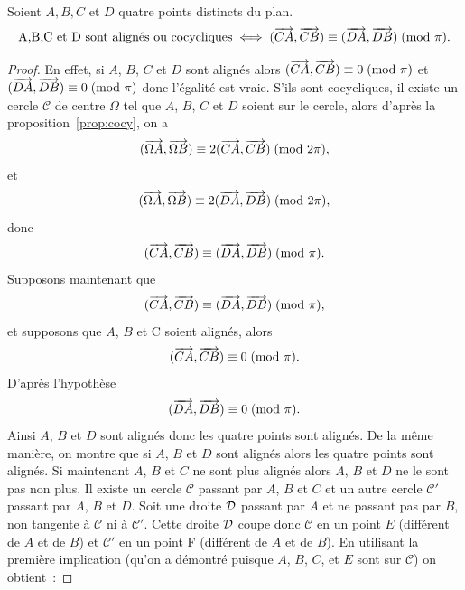 \begin{theo}
  Soient \(A,B,C\) et \(D\) quatre points distincts du plan.
  \begin{equation}
    \text{A,B,C et D sont alignés ou cocycliques} \iff (\overrightarrow{CA}, \overrightarrow{CB}) \equiv (\overrightarrow{DA}, \overrightarrow{DB})\!\pmod {\pi}.
  \end{equation}
\end{theo}
\begin{proof}
  En effet, si \(A\), \(B\), \(C\) et \(D\) sont alignés alors \((\overrightarrow{CA},\overrightarrow{CB}) \equiv 0\!\pmod {\pi}\) et \((\overrightarrow{DA},\overrightarrow{DB}) \equiv 0\!\pmod {\pi}\) donc l'égalité est vraie. S'ils sont cocycliques, il existe un cercle \(\mathcal{C}\) de centre \(\Omega\) tel que \(A\), \(B\), \(C\) et \(D\) soient sur le cercle, alors d'après la proposition~\ref{prop:cocy}, on a
  \begin{equation}
    (\overrightarrow{\Omega A}, \overrightarrow{\Omega B}) \equiv 2(\overrightarrow{CA},\overrightarrow{CB})\!\pmod {2\pi},
  \end{equation}
  et 
  \begin{equation}
    (\overrightarrow{\Omega A}, \overrightarrow{\Omega B}) \equiv 2(\overrightarrow{DA},\overrightarrow{DB})\!\pmod {2\pi},
  \end{equation}
  donc 
  \begin{equation}
    (\overrightarrow{CA},\overrightarrow{CB}) \equiv (\overrightarrow{DA},\overrightarrow{DB})\!\pmod {\pi}.
  \end{equation}
  Supposons maintenant que 
  \begin{equation}
    (\overrightarrow{CA},\overrightarrow{CB}) \equiv (\overrightarrow{DA},\overrightarrow{DB})\!\pmod {\pi},
  \end{equation}
  et supposons que \(A\), \(B\) et C soient alignés, alors 
  \begin{equation}
    (\overrightarrow{CA},\overrightarrow{CB}) \equiv 0\!\pmod {\pi}.
  \end{equation}
  D'après l'hypothèse
  \begin{equation}
    (\overrightarrow{DA},\overrightarrow{DB}) \equiv 0\!\pmod {\pi}.
  \end{equation}
  Ainsi \(A\), \(B\) et \(D\) sont alignés donc les quatre points sont alignés. De la même manière, on montre que si \(A\), \(B\) et \(D\) sont alignés alors les quatre points sont alignés. Si maintenant \(A\), \(B\) et \(C\) ne sont plus alignés alors \(A\), \(B\) et \(D\) ne le sont pas non plus. Il existe un cercle \(\mathcal{C}\) passant par \(A\), \(B\) et \(C\) et un autre cercle \(\mathcal{C}'\) passant par \(A\), \(B\) et \(D\). Soit une droite \(\mathcal{D}\) passant par \(A\) et ne passant pas par \(B\), non tangente à \(\mathcal{C}\) ni à \(\mathcal{C}'\). Cette droite \(\mathcal{D}\) coupe donc \(\mathcal{C}\) en un point \(E\) (différent de \(A\) et de \(B\)) et \(\mathcal{C}'\) en un point F (différent de \(A\) et de \(B\)). En utilisant la première implication (qu'on a démontré puisque \(A\), \(B\), \(C\), et \(E\) sont sur \(\mathcal{C}\)) on obtient~:

\end{proof}
